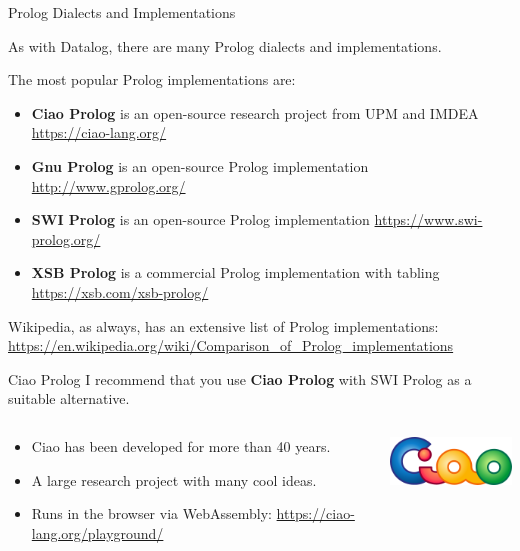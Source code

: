 \begin{frame}{Prolog Dialects and Implementations}

As with Datalog, there are many Prolog dialects and implementations.

The most popular Prolog implementations are:

\begin{itemize}
    \item \textbf{Ciao Prolog} is an open-source research project from UPM and
    IMDEA {\small \url{https://ciao-lang.org/}}
    \item \textbf{Gnu Prolog} is an open-source Prolog implementation \linebreak
    {\small \url{http://www.gprolog.org/}}
    \item \textbf{SWI Prolog} is an open-source Prolog implementation {\small
    \url{https://www.swi-prolog.org/}}
    \item \textbf{XSB Prolog} is a commercial Prolog implementation with tabling
    {\small \url{https://xsb.com/xsb-prolog/}}
\end{itemize}

Wikipedia, as always, has an extensive list of Prolog implementations: {\small
\url{https://en.wikipedia.org/wiki/Comparison_of_Prolog_implementations}}
\end{frame}

\begin{frame}{Ciao Prolog}
I recommend that you use \textbf{Ciao Prolog} with SWI Prolog as a suitable alternative.
\begin{columns}
\begin{column}{.7\textwidth}
\begin{itemize}
    \item Ciao has been developed for more than 40 years.
    \item A large research project with many cool ideas. 
    \item Runs in the browser via WebAssembly: {\small \url{https://ciao-lang.org/playground/}}
\end{itemize}
\end{column}
\begin{column}{.3\textwidth}
    \centering
    \includegraphics[width=0.8\columnwidth]{img/ciao-logo.png}
\end{column}
\end{columns}
\end{frame}

